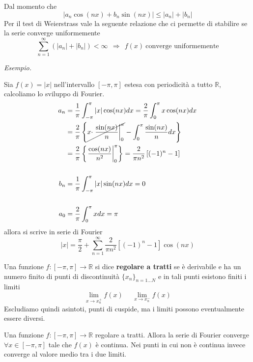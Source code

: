 \begin{rem}
 Dal momento che
\begin{equation*}
| a_{n}\cos( nx) +b_{n}\sin( nx)| \leqslant | a_{n}| +| b_{n}| 
\end{equation*}
Per il test di Weierstrass vale la seguente relazione che ci permette di stabilire se la serie converge uniformemente
\begin{equation*}
\sum\limits ^{\infty }_{n=1}(| a_{n}| +| b_{n}| ) < \infty \ \ \Rightarrow \ \ f( x) \ \text{converge uniformemente}
\end{equation*}
\end{rem}
\textit{Esempio.}

Sia $f( x) =| x| $ nell'intervallo $[ -\pi ,\pi ]$ estesa con periodicità a tutto $\mathbb{R}$, calcoliamo lo sviluppo di Fourier.
\begin{align*}
a_{n} & =\frac{1}{\pi }\int ^{\pi }_{-\pi }| x| \cos( nx) dx=\frac{2}{\pi }\int ^{\pi }_{0} x\cos( nx) dx\\
 & =\frac{2}{\pi }\left\{\cancel{x\cdotp \left. \frac{\sin( nx)}{n}\right| ^{\pi }_{0}} -\int ^{\pi }_{0}\frac{\sin( nx)}{n} dx\right\}\\
 & =\frac{2}{\pi }\left\{\left. \frac{\cos( nx)}{n^{2}}\right| ^{\pi }_{0}\right\} =\frac{2}{\pi n^{2}}\left[( -1)^{n} -1\right]\\
 & \\
b_{n} & =\frac{1}{\pi }\int ^{\pi }_{-\pi }| x| \sin( nx) dx=0\\
 & \\
a_{0} & =\frac{2}{\pi }\int ^{\pi }_{0} xdx=\pi 
\end{align*}
allora si scrive in serie di Fourier
\begin{equation*}
| x| =\frac{\pi }{2} +\sum\limits ^{\infty }_{n=1}\frac{2}{\pi n^{2}}\left[( -1)^{n} -1\right]\cos( nx)
\end{equation*}
\begin{defn}
Una funzione $f:[ -\pi ,\pi ]\rightarrow \mathbb{R}$ si dice \textbf{regolare a tratti} se è derivabile e ha un numero finito di punti di discontinuità $\{x_{n}\}_{n=1\dotsc N}$ e in tali punti esistono finiti i limiti
\begin{equation*}
\lim\limits _{x\rightarrow x^{+}_{n}} f( x) \ \ \ \ \ \ \lim\limits _{x\rightarrow x^{-}_{n}} f( x)
\end{equation*}
Escludiamo quindi asintoti, punti di cuspide, ma i limiti possono eventualmente essere diversi.
\end{defn}
\begin{thm}
 Una funzione $f:[ -\pi ,\pi ]\rightarrow \mathbb{R}$ regolare a tratti. Allora la serie di Fourier converge $\forall x\in [ -\pi ,\pi ]$ tale che $f( x)$ è continua. Nei punti in cui non è continua invece converge al valore medio tra i due limiti.
\end{thm}
